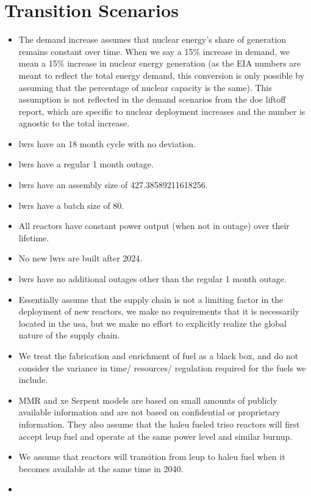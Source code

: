 \section{Transition Scenarios}

\begin{itemize}
    \item The demand increase assumes that nuclear energy's share of generation remains constant over time. When we say a 15$\%$ increase in demand, we mean a 15$\%$ increase in nuclear energy generation (as the EIA numbers are meant to reflect the total energy demand, this conversion is only possible by assuming that the percentage of nuclear capacity is the same). This assumption is not reflected in the demand scenarios from the \gls{doe} liftoff report, which are specific to nuclear deployment increases and the number is agnostic to the total increase.
    \item \gls{lwr}s have an 18 month cycle with no deviation.
    \item \gls{lwr}s have a regular 1 month outage.
    \item \gls{lwr}s have an assembly size of 427.38589211618256.
    \item \gls{lwr}s have a batch size of 80.
    \item All reactors have constant power output (when not in outage) over their lifetime.
    \item No new \gls{lwr}s are built after 2024. %
    \item \gls{lwr}s have no additional outages other than the regular 1 month outage.
    \item Essentially assume that the supply chain is not a limiting factor in the deployment of new reactors, we make no requirements that it is necessarily located in the \gls{usa}, but we make no effort to explicitly realize the global nature of the supply chain.
    \item We treat the fabrication and enrichment of fuel as a black box, and do not consider the variance in time/ resources/ regulation required for the fuels we include.
    \item MMR and \gls{xe} Serpent models are based on small amounts of publicly available information and are not based on confidential or proprietary information. They also assume that the \gls{haleu} fueled \gls{triso} reactors will first accept \gls{leup} fuel and operate at the same power level and similar burnup.
    \item We assume that reactors will transition from \gls{leup} to \gls{haleu} fuel when it becomes available at the same time in 2040.
    \item
\end{itemize}


